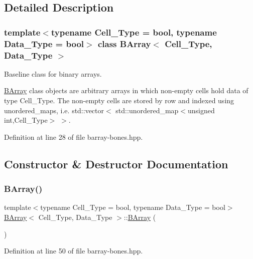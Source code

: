 \subsection{Detailed Description}
\subsubsection*{template$<$typename Cell\+\_\+\+Type = bool, typename Data\+\_\+\+Type = bool$>$\newline
class B\+Array$<$ Cell\+\_\+\+Type, Data\+\_\+\+Type $>$}

Baseline class for binary arrays. 

{\ttfamily \hyperlink{class_b_array}{B\+Array}} class objects are arbitrary arrays in which non-\/empty cells hold data of type {\ttfamily Cell\+\_\+\+Type}. The non-\/empty cells are stored by row and indexed using {\ttfamily unordered\+\_\+map}s, i.\+e. {\ttfamily std\+::vector$<$ std\+::unordered\+\_\+map$<$unsigned int,Cell\+\_\+\+Type$>$ $>$}. 

Definition at line 28 of file barray-\/bones.\+hpp.



\subsection{Constructor \& Destructor Documentation}
\mbox{\label{class_b_array_a1bbfcc43ad43f30fd448b63e9ab5861f}} 
\subsubsection{\texorpdfstring{B\+Array()}{BArray()}\hspace{0.1cm}{\footnotesize\ttfamily [1/5]}}
{\footnotesize\ttfamily template$<$typename Cell\+\_\+\+Type = bool, typename Data\+\_\+\+Type = bool$>$ \\
\hyperlink{class_b_array}{B\+Array}$<$ Cell\+\_\+\+Type, Data\+\_\+\+Type $>$\+::\hyperlink{class_b_array}{B\+Array} (\begin{DoxyParamCaption}{ }\end{DoxyParamCaption})\hspace{0.3cm}{\ttfamily [inline]}}



Definition at line 50 of file barray-\/bones.\+hpp.

\mbox{\label{class_b_array_a411b65e1985396261ca9df2923a6f3c6}} 
